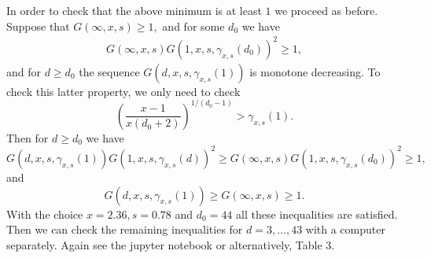 \documentclass[12pt,a4paper]{amsart}
\numberwithin{equation}{section}
\theoremstyle{plain}
\theoremstyle{definition}
\newcommand{\1}{\textbf{1}}
\begin{document}
In order to check that the above minimum is at least $1$ we proceed as before. Suppose that $G(\infty,x,s)\geqslant1,$ and for some $d_0$ we have 
\begin{align} \label{idea3-ineq-1}
G(\infty,x,s)G(1,x,s,\gamma_{x,s}(d_0))^{2}\geqslant1,
\end{align}
and for $d\geqslant d_0$ the sequence $G(d,x,s,\gamma_{x,s}(1))$ is monotone decreasing. To check this latter property, we only need to check 
$$\left(\frac{x-1}{x(d_0+2)}\right)^{1/(d_0-1)} > \gamma_{x,s}(1).$$
Then for $d\geqslant d_0$ we have
$$G(d,x,s,\gamma_{x,s}(1))G(1,x,s,\gamma_{x,s}(d))^{2}\geqslant G(\infty,x,s)G(1,x,s,\gamma_{x,s}(d_0))^{2}\geqslant1,$$
and 
$$G(d,x,s,\gamma_{x,s}(1))\geqslant G(\infty,x,s)\geqslant1.$$
With the choice $x=2.36, s=0.78$ and $d_0=44$ all these inequalities are satisfied. Then we can check the remaining inequalities for $d=3,\dots ,43$ with a computer separately. Again see the jupyter notebook \cite{JUP} or alternatively, Table 3.
\bigskip
\end{document}
